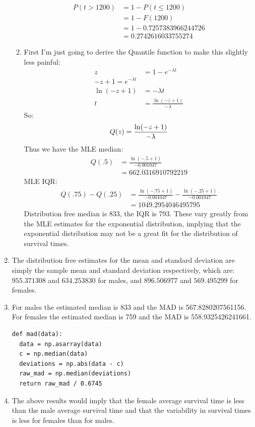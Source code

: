 \documentclass{article}
\begin{document}
\begin{enumerate}
\begin{enumerate}[label=\alph*)]
\begin{align*}
P(t > 1200) &= 1 - P(t \leq 1200) \\
&= 1 - F(1200) \\
&= 1 - 0.7257383966244726 \\
&= 0.2742616033755274
\end{align*}
\item First I'm just going to derive the Quantile function to make this slightly less painful: \\
\begin{align*}
z &= 1 - e^{-\lambda t} \\
-z + 1 = e^{-\lambda t} \\
\ln(-z + 1) &= -\lambda t \\
t &= \frac{\ln(-z + 1)}{-\lambda}
\end{align*}
So: \\
\[
Q(z) = \frac{\ln(-z + 1)}{-\lambda} \\
\]
Thus we have the MLE median: \\
\begin{align*}
Q(.5) &= \frac{\ln(-.5 + 1)}{-0.001047} \\
&= 662.0316910792219
\end{align*}
MLE IQR: \\
\begin{align*}
Q(.75) - Q(.25) &= \frac{\ln(-.75 + 1)}{-0.001047} - \frac{\ln(-.25 + 1)}{-0.001047} \\
&= 1049.2954046495795
\end{align*}
Distribution free median is 833, the IQR is 793. These vary greatly from the MLE estimates for the exponential distribution, implying that the exponential distribution may not be a great fit for the distribution of survival times. \\
\end{enumerate}
\item The distribution free estimates for the mean and standard deviation are simply the sample mean and standard deviation respectively, which are: $955.371308$ and $634.253830$ for males, and $896.506977$ and $569.495299$ for females. \\
\item For males the estimated median is 833 and the MAD is 567.8280207561156. For females the estimated median is 759 and the MAD is 558.9325426241661.\\
\begin{verbatim}
def mad(data):
  data = np.asarray(data)
  c = np.median(data)
  deviations = np.abs(data - c)
  raw_mad = np.median(deviations)
  return raw_mad / 0.6745
\end{verbatim}
\item The above results would imply that the female average survival time is less than the male average survival time and that the variability in survival times is less for females than for males.
\end{enumerate}
\end{document}
